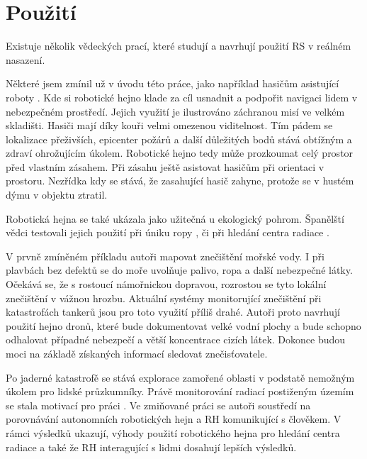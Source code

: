 \section{Použití}
Existuje několik vědeckých prací, které studují a navrhují použití RS v reálném nasazení. 
\par 
Některé jsem zmínil už v úvodu této práce, jako například hasičům asistující roboty \citep{fireRobots}.  Kde si robotické hejno klade za cíl usnadnit a podpořit navigaci lidem v nebezpečném prostředí. Jejich využití je ilustrováno záchranou misí ve velkém skladišti. Hasiči mají díky kouři velmi omezenou viditelnost. Tím pádem se lokalizace přeživších, epicenter požárů a další důležitých bodů stává obtížným a zdraví ohrožujícím úkolem. Robotické hejno tedy může prozkoumat celý prostor před vlastním zásahem. Při zásahu ještě asistovat hasičům při orientaci v prostoru. Nezřídka kdy se stává, že zasahující hasič zahyne, protože se v hustém dýmu v objektu ztratil.
\par
Robotická hejna se také ukázala jako užitečná u ekologický pohrom. Španělští vědci testovali jejich použití při úniku ropy \citep{oilSwarm}, či při hledání centra radiace \citep{radiationSwarm}. 
\par 
V prvně zmíněném příkladu autoři mapovat znečištění mořské vody. I při plavbách bez defektů se do moře uvolňuje palivo, ropa a další nebezpečné látky. Očekává se, že s rostoucí námořnickou dopravou, rozrostou se tyto lokální znečištění v vážnou hrozbu. Aktuální systémy monitorující znečištění při katastrofách tankerů jsou pro toto využití příliš drahé. Autoři proto navrhují použití hejno dronů, které bude dokumentovat velké vodní plochy a bude schopno odhalovat případné nebezpečí a větší koncentrace cizích látek. Dokonce budou moci na základě získaných informací sledovat znečisťovatele. 
\par
Po jaderné katastrofě se stává explorace zamořené oblasti  v podstatě nemožným úkolem pro lidské průzkumníky. Právě monitorování radiací postiženým územím se stala motivací pro práci \citep{radiationSwarm}. Ve zmiňované práci se autoři soustředí na porovnávání autonomních robotických hejn a RH komunikující s člověkem. V rámci výsledků ukazují, výhody použití robotického hejna pro hledání centra radiace a také že RH interagující s lidmi dosahují lepších výsledků.
\par
